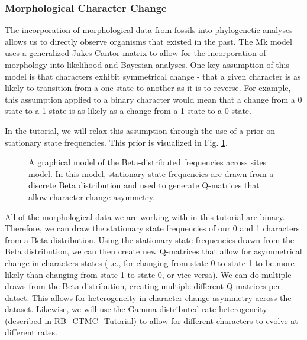 \subsubsection{Morphological Character Change}\label{subsub:Intro-Morpho}

The incorporation of morphological data from fossils into phylogenetic analyses allows us to directly observe organisms that existed in the past.
The Mk model \citep{Lewis2001} uses a generalized Jukes-Cantor matrix to allow for the incorporation of morphology into likelihood and Bayesian analyses.
One key assumption of this model is that characters exhibit symmetrical change - that a given character is as likely to transition from a one state to another as it is to reverse.
For example, this assumption applied to a binary character would mean that a change from a 0 state to a 1 state is as likely as a change from a 1 state to a 0 state. \par
In the tutorial, we will relax this assumption through the use of a prior on stationary state frequencies. 
This prior is visualized in Fig. \ref{fig:morpho_gm}. 
\begin{figure}[h!]
\centering
{}
\caption{\small A graphical model of the Beta-distributed frequencies across sites model. In this model, stationary state frequencies are drawn from a discrete Beta distribution and used to generate Q-matrices that allow character change asymmetry.}
\label{fig:morpho_gm}
\end{figure}
All of the morphological data we are working with in this tutorial are binary.  
Therefore, we can draw the stationary state frequencies of our 0 and 1 characters from a Beta distribution. 
Using the stationary state frequencies drawn from the Beta distribution, we can then create new Q-matrices that allow for asymmetrical change in characters states (i.e., for changing from state 0 to state 1 to be more likely than changing from state 1 to state 0, or vice versa). 
We can do multiple draws from the Beta distribution, creating multiple different Q-matrices per datset.
This allows for heterogeneity in character change asymmetry across the dataset. 
Likewise, we will use the Gamma distributed rate heterogeneity (described in \href{https://github.com/revbayes/revbayes_tutorial/raw/master/tutorial_TeX/RB_CTMC_Tutorial/RB_CTMC_Tutorial.pdf}{RB\_CTMC\_Tutorial}) to allow for different characters to evolve at different rates.\par


